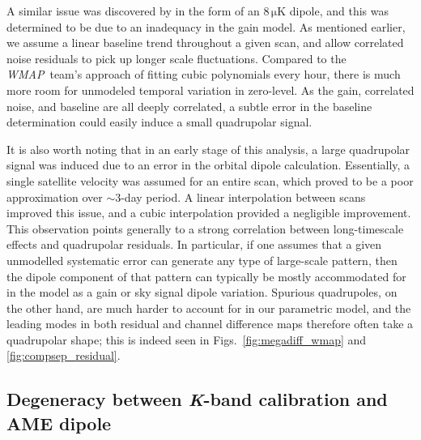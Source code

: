 \documentclass[twocolumn]{../../common/aa}
\def\WMAP{\emph{WMAP}}
\def\WMAPnine{\emph{WMAP9}}
\newcommand{\K}[0]{\textit K}
\begin{document}
A similar issue was discovered by \citet{jarosik2007} in the form of an $8\,\mathrm{\mu K}$ dipole, and this was determined to be due to an inadequacy in the gain model. As mentioned earlier, we assume a linear baseline trend throughout a given scan, and allow correlated noise residuals to pick up longer scale fluctuations. Compared to the \WMAP\ team's approach of fitting cubic polynomials every hour, there is much more room for unmodeled temporal variation in zero-level. As the gain, correlated noise, and baseline are all deeply correlated, a subtle error in the baseline determination could easily induce a small quadrupolar signal.

It is also worth noting that in an early stage of this analysis, a large quadrupolar signal was induced due to an error in the orbital dipole calculation. Essentially, a single satellite velocity was assumed for an entire scan, which proved to be a poor approximation over $\sim3$-day period. A linear interpolation between scans improved this issue, and a cubic interpolation provided a negligible improvement. This observation points generally to a strong correlation between long-timescale effects and quadrupolar residuals. In particular, if one assumes that a given unmodelled systematic error can generate any type of large-scale pattern, then the dipole component of that pattern can typically be mostly accommodated for in the model as a gain or sky signal dipole variation. Spurious quadrupoles, on the other hand, are much harder to account for in our parametric model, and the leading modes in both residual and channel difference maps therefore often take a quadrupolar shape; this is indeed seen in Figs.~\ref{fig:megadiff_wmap} and \ref{fig:compsep_residual}. 


\subsection{Degeneracy between \K-band calibration and AME dipole}
\label{sec:ame_Kband}
\end{document}
